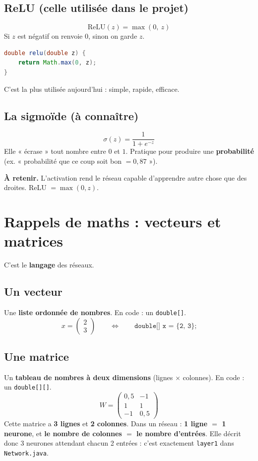 \documentclass[11pt]{article}
\begin{document}
\subsection{ReLU (celle utilisée dans le projet)}
\[
\mathrm{ReLU}(z) = \max(0,\ z)
\]
Si $z$ est négatif on renvoie $0$, sinon on garde $z$.
\begin{lstlisting}[language=Java]
double relu(double z) {
    return Math.max(0, z);
}
\end{lstlisting}
C'est la plus utilisée aujourd'hui : simple, rapide, efficace.

\subsection{La sigmoïde (à connaître)}
\[
\sigma(z) = \frac{1}{1 + e^{-z}}
\]
Elle « écrase » tout nombre entre $0$ et $1$. Pratique pour produire une
\textbf{probabilité} (ex. « probabilité que ce coup soit bon $= 0{,}87$ »).

\begin{retenir}
\textbf{À retenir.} L'activation rend le réseau capable d'apprendre autre chose
que des droites. ReLU $= \max(0,z)$.
\end{retenir}

\section{Rappels de maths : vecteurs et matrices}

C'est le \textbf{langage} des réseaux.

\subsection{Un vecteur}
Une \textbf{liste ordonnée de nombres}. En code : un \texttt{double[]}.
\[
x = \begin{pmatrix} 2 \\ 3 \end{pmatrix}
\qquad\Longleftrightarrow\qquad
\texttt{double[] x = \{2, 3\};}
\]

\subsection{Une matrice}
Un \textbf{tableau de nombres à deux dimensions} (lignes $\times$ colonnes).
En code : un \texttt{double[][]}.
\[
W = \begin{pmatrix} 0{,}5 & -1 \\ 1 & 1 \\ -1 & 0{,}5 \end{pmatrix}
\]
Cette matrice a \textbf{3 lignes} et \textbf{2 colonnes}. Dans un réseau :
\textbf{1 ligne $=$ 1 neurone}, et \textbf{le nombre de colonnes $=$ le nombre
d'entrées}. Elle décrit donc 3 neurones attendant chacun 2 entrées : c'est
exactement \texttt{layer1} dans \texttt{Network.java}.
\end{document}
